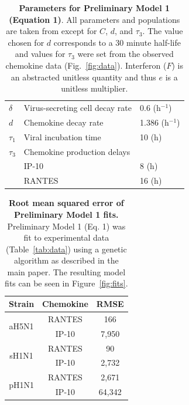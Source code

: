 \documentclass[preprint,10pt,authoryear]{article}
\begin{document}
\begin{table}[!ht]
\begin{center}
\begin{tabular}{|  l  l  l  |}
  $\delta$ & Virus-secreting cell decay rate & 0.6 (h$^{-1}$) \\
  $d$ & Chemokine decay rate & 1.386 (h$^{-1}$) \\
  $\tau_1$ & Viral incubation time & 10 (h) \\
  $\tau_3$ & Chemokine production delays & \\
    & \hspace{2em} IP-10 & 8 (h)\\
    & \hspace{2em} RANTES & 16 (h)\\
  \hline
\end{tabular}
\caption{\textbf{Parameters for Preliminary Model 1 (Equation 1)}.  All parameters and populations are taken from \citep{Mitchell2011} except for $C$, $d$, and $\tau_3$.  The value chosen for $d$ corresponds to a 30 minute half-life and values for $\tau_3$ were set from the observed chemokine data (Fig.~\ref{fig:data}).  Interferon ($F$) is an abstracted unitless quantity and thus $e$ is a unitless multiplier.}
\label{tab:dde}
\end{center}
\end{table}


\begin{table}[!ht]
\begin{center}
\begin{tabular}{| c | c | c |}
  \hline
  Strain & Chemokine & RMSE \\
  \hline
  \multirow{2}{*}{aH5N1} & RANTES & 166 \\
  & IP-10 & 7,950 \\
  \hline
  \multirow{2}{*}{sH1N1} & RANTES & 90 \\
  & IP-10 & 2,732 \\
  \hline
  \multirow{2}{*}{pH1N1} & RANTES & 2,671  \\
  & IP-10 & 64,342 \\
  \hline
\end{tabular}
\caption{\textbf{Root mean squared error of Preliminary Model 1 fits.}  Preliminary Model 1 (Eq. 1) was fit to experimental data (Table~\ref{tab:data}) using a genetic algorithm as described in the main paper.  The resulting model fits can be seen in Figure~\ref{fig:fits}.}
\label{tab:rmse}
\end{center}
\end{table}
\end{document}

